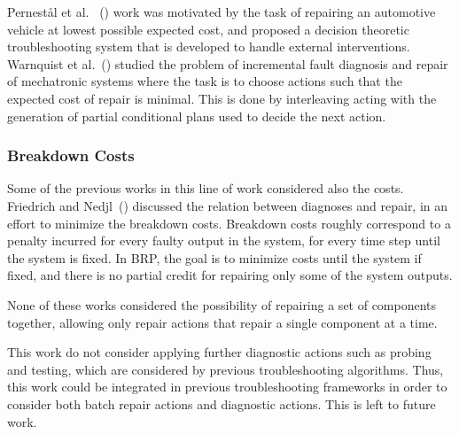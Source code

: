 \documentclass[review]{elsarticle}
\newcommand\roni[1]{\textcolor{green}{roni: #1}}
\begin{document}
Pernest{\aa}l et al. ~(\cite{Nyberg12}) work was motivated by the task of repairing an automotive vehicle at lowest possible expected cost, and proposed a decision theoretic troubleshooting system that is developed to handle external interventions. Warnquist et al.~(\cite{warnquist2009planning}) studied the problem of incremental fault diagnosis and repair of mechatronic systems where the task is to choose actions such that the expected cost of repair is minimal. This is done by interleaving acting with the generation of partial conditional plans used to decide the next action.

\subsubsection{Breakdown Costs}
Some of the previous works in this line of work considered also the costs. Friedrich and Nedjl~(\cite{friedrich1992choosing}) discussed the relation between diagnoses and repair, in an effort to minimize the breakdown costs. Breakdown costs roughly correspond to a penalty incurred for every faulty output in the system, for every time step until the system is fixed. In BRP, the goal is to minimize costs until the system if fixed, and there is no partial credit for repairing only some of the system outputs.


None of these works considered the possibility of repairing a set of components together, allowing only repair actions that repair a single component at a time.

This work do not consider applying further diagnostic actions such as probing and testing, which are considered by previous troubleshooting algorithms. Thus, this work could be integrated in previous troubleshooting frameworks in order to consider both batch repair actions and diagnostic actions. This is left to future work.
\end{document}
